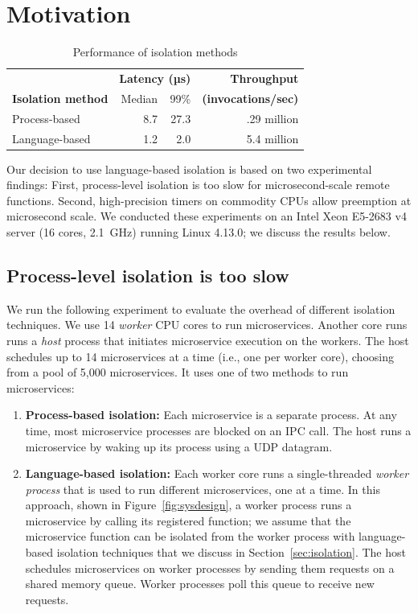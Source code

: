 \section{Motivation}
\label{sec:motive}

\begin{table}
\begin{center}
\small
\begin{tabular}{lrrr}
   & \multicolumn{2}{c}{\textbf{Latency (µs)}} & \textbf{Throughput} \\
  \textbf{Isolation method} & Median & 99\% & \textbf{(invocations/sec)} \\
\midrule
Process-based & 8.7 & 27.3 & .29 million \\
Language-based & 1.2 & 2.0 & 5.4 million \\
\end{tabular}
\caption{Performance of isolation methods}
\label{tab:isolation_methods}
\end{center}
\end{table}

Our decision to use language-based isolation is based on two experimental
findings:  First, process-level isolation is too slow for
microsecond-scale remote functions. Second, high-precision timers on commodity
CPUs allow preemption at microsecond scale.  We conducted these experiments
on an Intel Xeon E5-2683 v4 server (16 cores, 2.1~GHz) running
Linux 4.13.0; we discuss the results below.

\subsection{Process-level isolation is too slow}
We run the following experiment to evaluate the overhead of different isolation
techniques. We use 14 \emph{worker} CPU cores to run microservices. Another core runs
runs a \emph{host} process that initiates microservice execution on the workers.
The host schedules up to 14 microservices at a time (i.e., one
per worker core), choosing from a pool of 5,000 microservices. It uses one of two
methods to run microservices:

\begin{enumerate}
\item \textbf{Process-based isolation:} Each microservice is a separate process.
At any time, most microservice processes are blocked on an IPC
call. The host runs a microservice by waking up its process using a UDP datagram.
\item \textbf{Language-based isolation:} Each worker core runs a single-threaded
\emph{worker process} that is used to run different microservices, one at a time.
In this approach, shown in Figure~\ref{fig:sysdesign}, a worker process runs a
microservice by calling its registered
function; we assume that the microservice function can be isolated from the
worker process with language-based isolation techniques that we discuss in
Section~\ref{sec:isolation}. The host schedules microservices on worker processes by
sending them
requests on a shared memory queue. Worker processes poll this queue to receive
new requests.
\end{enumerate}

